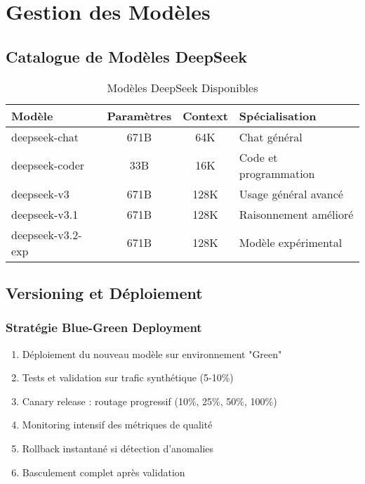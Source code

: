 \documentclass[12pt,a4paper]{article}
\begin{document}
\newpage
\section{Gestion des Modèles}

\subsection{Catalogue de Modèles DeepSeek}

\begin{table}[h]
\centering
\small
\begin{tabular}{|l|c|c|l|}
\hline
\textbf{Modèle} & \textbf{Paramètres} & \textbf{Context} & \textbf{Spécialisation} \\
\hline
deepseek-chat & 671B & 64K & Chat général \\
deepseek-coder & 33B & 16K & Code et programmation \\
deepseek-v3 & 671B & 128K & Usage général avancé \\
deepseek-v3.1 & 671B & 128K & Raisonnement amélioré \\
deepseek-v3.2-exp & 671B & 128K & Modèle expérimental \\
\hline
\end{tabular}
\caption{Modèles DeepSeek Disponibles}
\end{table}

\subsection{Versioning et Déploiement}

\subsubsection{Stratégie Blue-Green Deployment}
\begin{enumerate}[noitemsep]
    \item Déploiement du nouveau modèle sur environnement "Green"
    \item Tests et validation sur trafic synthétique (5-10\%)
    \item Canary release : routage progressif (10\%, 25\%, 50\%, 100\%)
    \item Monitoring intensif des métriques de qualité
    \item Rollback instantané si détection d'anomalies
    \item Basculement complet après validation
\end{enumerate}
\end{document}
